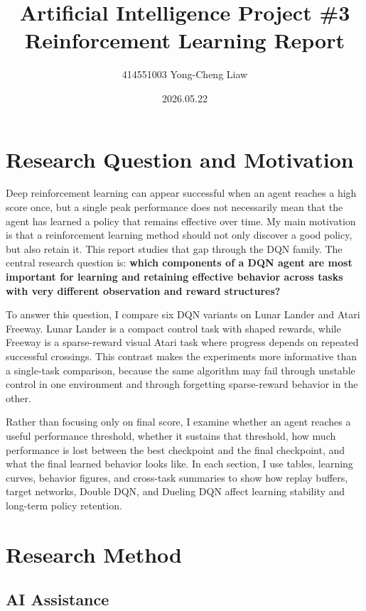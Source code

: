 \documentclass[12pt]{article}
\title{Artificial Intelligence Project \#3 Reinforcement Learning Report}
\author[1]{414551003 Yong-Cheng Liaw}
\affil[1]{National Yang Ming Chiao Tung University}
\date{2026.05.22}
\makeatletter
\renewcommand\maketitle{%
  \begin{center}
    {\LARGE\bfseries\textcolor{black}{\@title}\par}
    {\normalsize\@author \par}
  \end{center}\par
}
\makeatother
\begin{document}
\thispagestyle{firststyle}
\vspace*{-20pt}
\maketitle
\suppressfloats[t]

\section{Research Question and Motivation}

Deep reinforcement learning can appear successful when an agent reaches a high score once, but a single peak performance does not necessarily mean that the agent has learned a policy that remains effective over time. My main motivation is that a reinforcement learning method should not only discover a good policy, but also retain it. This report studies that gap through the DQN family. The central research question is: \textbf{which components of a DQN agent are most important for learning and retaining effective behavior across tasks with very different observation and reward structures?}

To answer this question, I compare six DQN variants on Lunar Lander and Atari Freeway. Lunar Lander is a compact control task with shaped rewards, while Freeway is a sparse-reward visual Atari task where progress depends on repeated successful crossings. This contrast makes the experiments more informative than a single-task comparison, because the same algorithm may fail through unstable control in one environment and through forgetting sparse-reward behavior in the other.

Rather than focusing only on final score, I examine whether an agent reaches a useful performance threshold, whether it sustains that threshold, how much performance is lost between the best checkpoint and the final checkpoint, and what the final learned behavior looks like. In each section, I use tables, learning curves, behavior figures, and cross-task summaries to show how replay buffers, target networks, Double DQN, and Dueling DQN affect learning stability and long-term policy retention.

\section{Research Method}

\subsection{AI Assistance}
\end{document}
